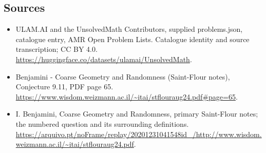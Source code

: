 \documentclass[11pt,a4paper]{article}
\begin{document}
\subsection{Sources}
\begin{itemize}
\item[S1] ULAM.AI and the UnsolvedMath Contributors, supplied problems.json, catalogue entry, AMR Open Problem Lists. Catalogue identity and source transcription; CC BY 4.0.
\url{https://huggingface.co/datasets/ulamai/UnsolvedMath}.
\item[S2] Benjamini - Coarse Geometry and Randomness (Saint-Flour notes), Conjecture 9.11, PDF page 65. 
\url{https://www.wisdom.weizmann.ac.il/~itai/stflouraug24.pdf#page=65}.
\item[S3] I. Benjamini, Coarse Geometry and Randomness, primary Saint-Flour notes; the numbered question and its surrounding definitions.
\url{https://arquivo.pt/noFrame/replay/20201231041548id_/http://www.wisdom.weizmann.ac.il/~itai/stflouraug24.pdf}.
\end{itemize}
\end{document}
